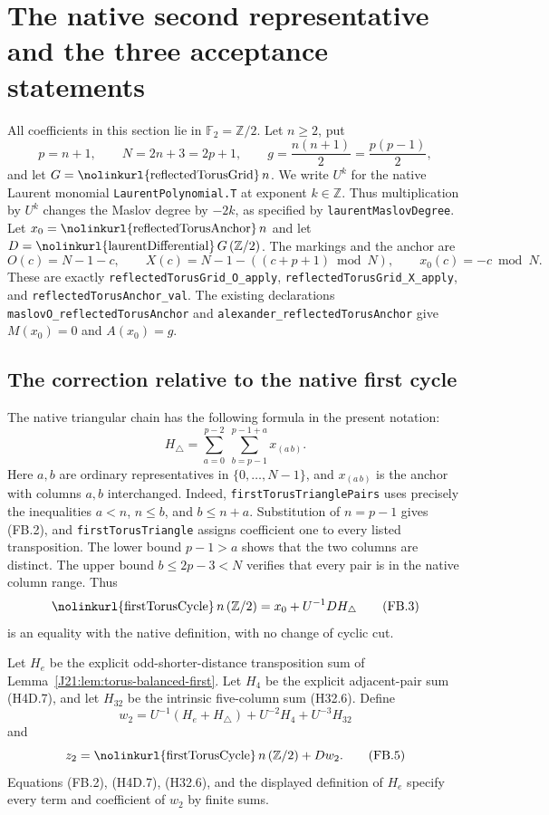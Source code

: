 \documentclass[11pt,oneside]{report}
\theoremstyle{definition}
\numberwithin{equation}{section}
\newcommand{\decl}[1]{\textnormal{\nolinkurl{#1}}}
\begin{document}
\section{The native second representative and the three acceptance statements}
\label{J21:sec:torus-final-bridge}

All coefficients in this section lie in $\mathbb F _2=\mathbb Z/2$.
Let $n\geq2$, put
\[
                  p=n+1,\qquad N=2n+3=2p+1,\qquad
                  g=\frac{n(n+1)}2=\frac{p(p-1)}2,
\]
and let $G=\decl{reflectedTorusGrid}\,n$.
We write $U^k$ for the native Laurent monomial
\decl{LaurentPolynomial.T} at exponent $k\in\mathbb Z$.
Thus multiplication by $U^k$ changes the Maslov degree by $-2k$,
as specified by \decl{laurentMaslovDegree}.
Let $x_0=\decl{reflectedTorusAnchor}\,n$ and let
$D=\decl{laurentDifferential}\,G\,(\mathbb Z/2)$.
The markings and the anchor are
\[
       O(c)=N-1-c,\qquad
       X(c)=N-1-((c+p+1)\bmod N),\qquad
       x_0(c)=-c\bmod N.
 \tag{FB.1}
\]
These are exactly \decl{reflectedTorusGrid_O_apply},
\decl{reflectedTorusGrid_X_apply}, and
\decl{reflectedTorusAnchor_val}.
The existing declarations \decl{maslovO_reflectedTorusAnchor} and
\decl{alexander_reflectedTorusAnchor} give $M(x_0)=0$ and $A(x_0)=g$.

\subsection{The correction relative to the native first cycle}

The native triangular chain has the following formula in the present
notation:
\[
 H_{\triangle}
   =\sum_{a=0}^{p-2}\ \sum_{b=p-1}^{p-1+a}x_{(a\,b)}.
 \tag{FB.2}
\]
Here $a,b$ are ordinary representatives in $\{0,\ldots,N-1\}$,
and $x_{(a\,b)}$ is the anchor with columns $a,b$ interchanged.
Indeed, \decl{firstTorusTrianglePairs} uses precisely the inequalities
$a<n$, $n\leq b$, and $b\leq n+a$.
Substitution of $n=p-1$ gives (FB.2), and
\decl{firstTorusTriangle} assigns coefficient one to every listed
transposition.
The lower bound $p-1>a$ shows that the two columns are distinct.
The upper bound $b\leq2p-3<N$ verifies that every pair is in the
native column range.
Thus
\[
 \decl{firstTorusCycle}\,n\,(\mathbb Z/2)
                       =x_0+U^{-1}D H_{\triangle}
 \tag{FB.3}
\]
is an equality with the native definition, with no change of cyclic cut.

Let $H_e$ be the explicit odd-shorter-distance transposition sum of
Lemma~\ref{J21:lem:torus-balanced-first}.
Let $H_4$ be the explicit adjacent-pair sum (H4D.7), and let
$H_{32}$ be the intrinsic five-column sum (H32.6).
Define
\[
 \boxed{\displaystyle
 w_2=U^{-1}(H_e+H_{\triangle})+U^{-2}H_4+U^{-3}H_{32}}
 \tag{FB.4}
\]
and
\[
 z_2=\decl{firstTorusCycle}\,n\,(\mathbb Z/2)+D w_2.
 \tag{FB.5}
\]
Equations (FB.2), (H4D.7), (H32.6), and the displayed definition of
$H_e$ specify every term and coefficient of $w_2$ by finite sums.
\end{document}
